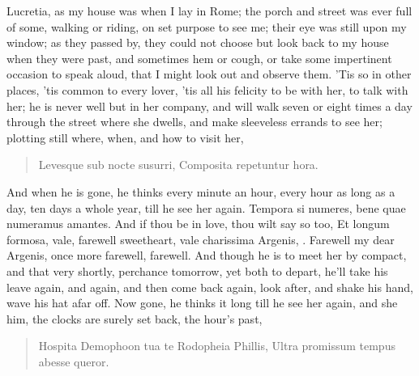 Lucretia, as my house was when I lay in Rome; the porch and street was
ever full of some, walking or riding, on set purpose to see me; their
eye was still upon my window; as they passed by, they could not choose
but look back to my house when they were past, and sometimes hem or
cough, or take some impertinent occasion to speak aloud, that I might
look out and observe them. 'Tis so in other places, 'tis common to
every lover, 'tis all his felicity to be with her, to talk with her; he
is never well but in her company, and will walk  seven or eight
times a day through the street where she dwells, and make sleeveless
errands to see her; plotting still where, when, and how to visit her,

\begin{latin}
\begin{verse}
Levesque sub nocte susurri,
Composita repetuntur hora.
\end{verse}
\end{latin}

And when he is gone, he thinks every minute an hour, every hour as long
as a day, ten days a whole year, till he see her again. Tempora
si numeres, bene quae numeramus amantes. And if thou be in love, thou
wilt say so too, Et longum formosa, vale, farewell sweetheart, vale
charissima Argenis, \etc{}. Farewell my dear Argenis, once more farewell,
farewell. And though he is to meet her by compact, and that very
shortly, perchance tomorrow, yet both to depart, he'll take his leave
again, and again, and then come back again, look after, and shake his
hand, wave his hat afar off. Now gone, he thinks it long till he see
her again, and she him, the clocks are surely set back, the hour's
past,

\begin{latin}
\begin{verse}
Hospita Demophoon tua te Rodopheia Phillis,
Ultra promissum tempus abesse queror.
\end{verse}
\end{latin}

